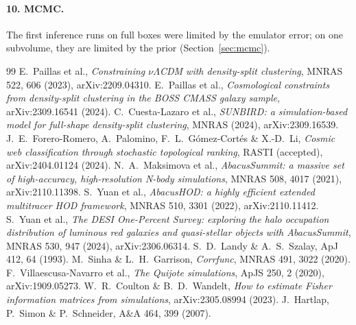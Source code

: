 \documentclass[11pt,twocolumn]{article}
\begin{document}
\paragraph{10. MCMC.} The first inference runs on full boxes were limited by the emulator error; on one subvolume, they are limited by the prior (Section~\ref{sec:mcmc}).

\begin{thebibliography}{99}
 E.~Paillas et al., \emph{Constraining $\nu\Lambda$CDM with density-split clustering}, MNRAS 522, 606 (2023), arXiv:2209.04310.
 E.~Paillas et al., \emph{Cosmological constraints from density-split clustering in the BOSS CMASS galaxy sample}, arXiv:2309.16541 (2024).
 C.~Cuesta-Lazaro et al., \emph{SUNBIRD: a simulation-based model for full-shape density-split clustering}, MNRAS (2024), arXiv:2309.16539.
 J.~E.~Forero-Romero, A.~Palomino, F.~L.~G\'omez-Cort\'es \& X.-D.~Li, \emph{Cosmic web classification through stochastic topological ranking}, RASTI (accepted), arXiv:2404.01124 (2024).
 N.~A.~Maksimova et al., \emph{AbacusSummit: a massive set of high-accuracy, high-resolution N-body simulations}, MNRAS 508, 4017 (2021), arXiv:2110.11398.
 S.~Yuan et al., \emph{AbacusHOD: a highly efficient extended multitracer HOD framework}, MNRAS 510, 3301 (2022), arXiv:2110.11412.
 S.~Yuan et al., \emph{The DESI One-Percent Survey: exploring the halo occupation distribution of luminous red galaxies and quasi-stellar objects with AbacusSummit}, MNRAS 530, 947 (2024), arXiv:2306.06314.
 S.~D.~Landy \& A.~S.~Szalay, ApJ 412, 64 (1993).
 M.~Sinha \& L.~H.~Garrison, \emph{Corrfunc}, MNRAS 491, 3022 (2020).
 F.~Villaescusa-Navarro et al., \emph{The Quijote simulations}, ApJS 250, 2 (2020), arXiv:1909.05273.
 W.~R.~Coulton \& B.~D.~Wandelt, \emph{How to estimate Fisher information matrices from simulations}, arXiv:2305.08994 (2023).
 J.~Hartlap, P.~Simon \& P.~Schneider, A\&A 464, 399 (2007).
\end{thebibliography}
\end{document}
